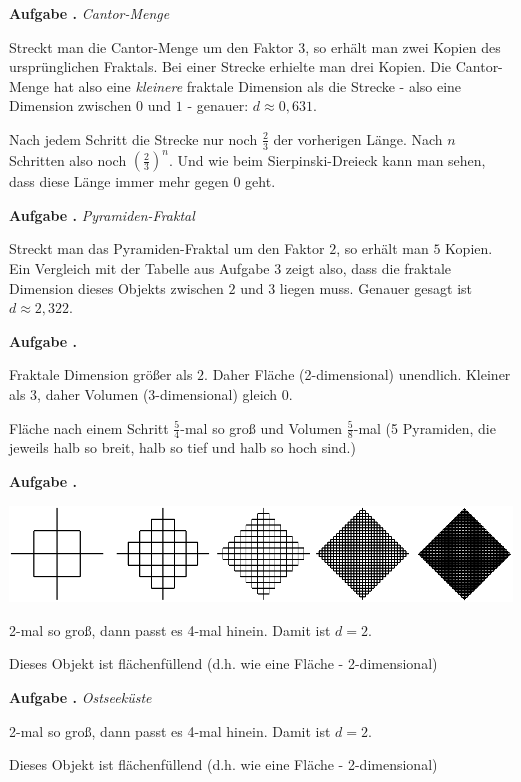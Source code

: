 \documentclass[a4paper,ngerman,12pt]{scrartcl}
\theoremstyle{definition}
\theoremstyle{plain}
\theoremstyle{remark}
\newlength{\aufgabenskip}
\newcounter{aufgabennummer}
\newenvironment{aufgabe}[1]{
  \addtocounter{aufgabennummer}{1}
  \textbf{Aufgabe \theaufgabennummer.} \emph{#1} \par
}{\vspace{\aufgabenskip}}
\begin{document}
\begin{aufgabe}{Cantor-Menge}
	Streckt man die Cantor-Menge um den Faktor $3$, so erhält man zwei Kopien des ursprünglichen Fraktals. Bei einer Strecke erhielte man drei Kopien. Die Cantor-Menge hat also eine \emph{kleinere} fraktale Dimension als die Strecke - also eine Dimension zwischen $0$ und $1$ - genauer: $d \approx 0,631$.
	
	Nach jedem Schritt die Strecke nur noch $\frac{2}{3}$ der vorherigen Länge. Nach $n$ Schritten also noch $\left(\frac{2}{3}\right)^n$. Und wie beim Sierpinski-Dreieck kann man sehen, dass diese Länge immer mehr gegen $0$ geht.
\end{aufgabe}

\begin{aufgabe}{Pyramiden-Fraktal}
	Streckt man das Pyramiden-Fraktal um den Faktor $2$, so erhält man $5$ Kopien. Ein Vergleich mit der Tabelle aus Aufgabe 3 zeigt also, dass die fraktale Dimension dieses Objekts zwischen $2$ und $3$ liegen muss. Genauer gesagt ist $d \approx 2,322$.
\end{aufgabe}
	
\begin{aufgabe}{}
	Fraktale Dimension größer als $2$. Daher Fläche (2-dimensional) unendlich. Kleiner als $3$, daher Volumen (3-dimensional) gleich 0.
	
	Fläche nach einem Schritt $\frac{5}{4}$-mal so groß und Volumen $\frac{5}{8}$-mal (5 Pyramiden, die jeweils halb so breit, halb so tief und halb so hoch sind.)
\end{aufgabe}

\begin{aufgabe}{}
	\begin{center}
		\includegraphics[width=.6\textwidth]{Bilder/Nicht-Fraktal-mehr-Schritte.pdf}
	\end{center}	
	
	2-mal so groß, dann passt es 4-mal hinein. Damit ist $d = 2$. 
	
	Dieses Objekt ist flächenfüllend (d.h. wie eine Fläche - 2-dimensional)
\end{aufgabe}

\begin{aufgabe}{Ostseeküste}
	2-mal so groß, dann passt es 4-mal hinein. Damit ist $d = 2$. 
	
	Dieses Objekt ist flächenfüllend (d.h. wie eine Fläche - 2-dimensional)
\end{aufgabe}
\end{document}
